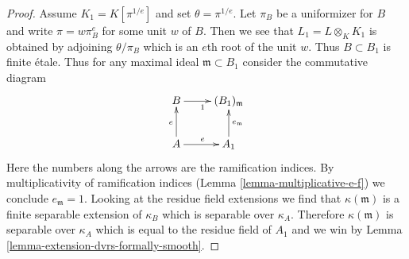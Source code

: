 \documentclass[10pt,a4paper]{amsart}
\theoremstyle{plain}
\theoremstyle{definition}
\theoremstyle{remark}
\numberwithin{equation}{subsection}
\begin{document}
\begin{proof}
\medskip\noindent
Assume $K_1 = K[\pi^{1/e}]$ and set $\theta = \pi^{1/e}$. Let $\pi_B$ be a
uniformizer for $B$ and write $\pi = w \pi_B^e$ for some unit $w$ of $B$.
Then we see that $L_1 = L \otimes_K K_1$ is obtained by adjoining
$\theta / \pi_B$ which is an $e$th root of the unit $w$. Thus
$B \subset B_1$ is finite \'etale. Thus for any maximal ideal
$\mathfrak m \subset B_1$ consider the commutative diagram
$$
\xymatrix{
B \ar[r]_1 & (B_1)_{\mathfrak m} \\
A \ar[u]^e \ar[r]^e & A_1 \ar[u]_{e_\mathfrak m}
}
$$
Here the numbers along the arrows are the ramification indices.
By multiplicativity of ramification indices
(Lemma \ref{lemma-multiplicative-e-f})
we conclude $e_\mathfrak m = 1$. Looking at the residue field extensions
we find that $\kappa(\mathfrak m)$ is a finite separable extension
of $\kappa_B$ which is separable over $\kappa_A$. Therefore
$\kappa(\mathfrak m)$ is separable over $\kappa_A$
which is equal to the residue field of $A_1$ and we win by
Lemma \ref{lemma-extension-dvrs-formally-smooth}.
\end{proof}
\end{document}

